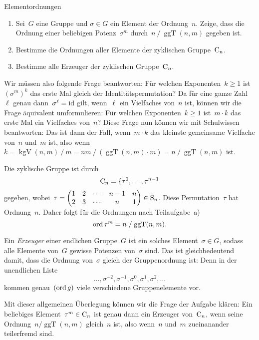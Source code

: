 \documentclass{algblatt}
\begin{document}
\begin{aufgabe}{Elementordnungen}
\begin{enumerate}
\item Sei~$G$ eine Gruppe und $\sigma \in G$ ein Element der Ordnung~$n$.
Zeige, dass die Ordnung einer be\-lie\-bi\-gen Potenz~$\sigma^m$ durch~$n \mathrel{/}
\operatorname{ggT}(n,m)$ gegeben ist.

\item Bestimme die Ordnungen aller Elemente der zyklischen Gruppe~$\mathrm{C}_n$.

\item Bestimme alle Erzeuger der zyklischen Gruppe~$\mathrm{C}_n$.
\end{enumerate}

\begin{loesungE}
\item Wir müssen also folgende Frage beantworten: Für welchen Exponenten~$k
\geq 1$ ist~$(\sigma^m)^k$ das erste Mal gleich der Identitätspermutation?
Da für eine ganze Zahl~$\ell$ genau dann~$\sigma^\ell = \mathrm{id}$ gilt, wenn~$\ell$
ein Vielfaches von~$n$ ist, können wir die Frage äquivalent umformulieren: Für
welchen Exponenten~$k \geq 1$ ist~$m \cdot k$ das erste Mal ein Vielfaches
von~$n$? Diese Frage nun können wir mit Schulwissen beantworten: Das ist dann
der Fall, wenn~$m \cdot k$ das kleinste gemeinsame Vielfache von~$n$ und~$m$
ist, also wenn~$k = \operatorname{kgV}(n,m) \mathrel{/} m = nm \mathrel{/}
(\operatorname{ggT}(n,m) \cdot m) = n \mathrel{/}
\operatorname{ggT}(n,m)$ ist.

\item Die zyklische Gruppe ist durch
\[ \mathrm{C}_n = \{ \tau^0, \ldots, \tau^{n-1} \]
gegeben, wobei~$\tau =
\begin{pmatrix}1&2&\cdots&n-1&n\\2&3&\cdots&n&1\end{pmatrix} \in \mathrm{S}_n$.
Diese Permutation~$\tau$ hat Ordnung~$n$. Daher
folgt für die Ordnungen nach Teilaufgabe~a)
\[ \operatorname{ord} \tau^m = n \mathrel{/} \operatorname{ggT}(n,m). \]

\item Ein \emph{Erzeuger} einer endlichen Gruppe~$G$ ist ein solches
Element~$\sigma \in G$, sodass alle Elemente von~$G$ gewisse Potenzen
von~$\sigma$ sind. Das ist gleichbedeutend damit, dass die Ordnung von~$\sigma$
gleich der Gruppenordnung ist: Denn in der unendlichen Liste
\[ \ldots, \sigma^{-2}, \sigma^{-1}, \sigma^0, \sigma^1, \sigma^2, \ldots \]
kommen genau~$(\operatorname{ord} g)$ viele verschiedene Gruppenelemente vor.

Mit dieser allgemeinen Überlegung können wir die Frage der Aufgabe klären: Ein
beliebiges Element~$\tau^m \in \mathrm{C}_n$ ist genau dann ein Erzeuger
von~$\mathrm{C}_n$, wenn seine Ordnung~$n / \operatorname{ggT}(n,m)$ gleich~$n$ ist,
also wenn~$n$ und~$m$ zueinanander teilerfremd sind.
\end{loesungE}
\end{aufgabe}
\end{document}
